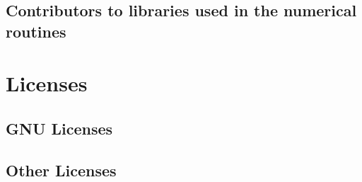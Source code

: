 \documentclass[12pt,a4paper,openany]{book}
\begin{document}
\section{Contributors to libraries used in the numerical routines}

\chapter{Licenses}

\section{GNU Licenses}

\section{Other Licenses}

\chapter{\tocbibname }
\end{document}
